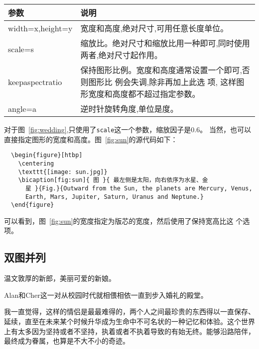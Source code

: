 \begin{table}[htbp]
  \centering
  \vspace{0.2cm}
  \zhongwu
  \begin{tabularx}{0.8\textwidth{}}{lX}
    \toprule
    参数             & 说明 \\
    \midrule
    width=x,height=y & 宽度和高度,绝对尺寸,可用任意长度单位。                           \\
    scale=s          & 缩放比。绝对尺寸和缩放比用一种即可,同时使用两者,绝对尺寸起作用。 \\
    keepaspectratio & 保持图形比例。宽度和高度通常设置一个即可,否则图形比
    例会失调,除非再加上此选 项,
    这样图形宽度和高度都不超过指定参数。                                                \\
    angle=a          & 逆时针旋转角度,单位是度。                                        \\
    \bottomrule
  \end{tabularx}
\end{table}

对于图~\ref{fig:wedding},只使用了\texttt{scale}这一个参数，缩放因子是0.6。
当然，也可以直接指定图形的宽度和高度。图~\ref{fig:sun}的源代码如下：

\begin{lstlisting}
  \begin{figure}[htbp]
    \centering
    \texttt{[image: sun.jpg]}
    \bicaption[fig:sun]{ 图 }{ 最左侧是太阳，向右依序为水星、金
      星 }{Fig.}{Outward from the Sun, the planets are Mercury, Venus,
      Earth, Mars, Jupiter, Saturn, Uranus and Neptune.}
  \end{figure}
\end{lstlisting}

可以看到，图~\ref{fig:sun}的宽度指定为版芯的宽度，然后使用了保持宽高比这
个选项。


\subsection{双图并列}

温文敦厚的新郎，美丽可爱的新娘。

Alan和Cher这一对从校园时代就相偎相依一直到步入婚礼的殿堂。

我一直觉得，这样的情侣是最最难得的，两个人之间最珍贵的东西得以一直保存、
延续，直至在未来某个时候升华成为生命中不可名状的一种记忆和体验。这个世界
上有太多因为坚持或者不坚持，执着或者不执着导致的有始无终。能够沿路陪伴，
最终成为眷属，也算是不大不小的奇迹。

